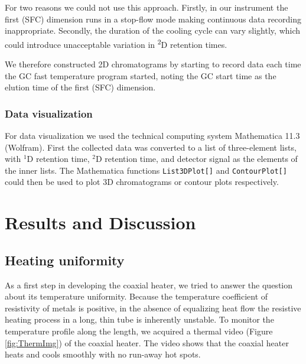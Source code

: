 \documentclass[aip,rsi,preprint,graphicx]{revtex4-1} %
\begin{document}
For two reasons we could not use this approach. Firstly, in our instrument the
first (SFC) dimension runs in a stop-flow mode making continuous data recording
inappropriate. Secondly, the duration of the cooling cycle can vary slightly,
which could introduce unacceptable variation in \textsuperscript{2}D retention
times.

We therefore constructed 2D chromatograms by starting to record data each time
the GC fast temperature program started, noting the GC start time as the elution
time of the first (SFC) dimension.

\subsubsection{Data visualization}
For data visualization we used the technical computing system Mathematica
11.3\texttrademark{} (Wolfram).  First the collected data was converted to a
list of three-element lists, with $^1$D retention time, $^2$D retention time,
and detector signal as the elements of the inner lists. The Mathematica
functions \texttt{List3DPlot[]} and \texttt{ContourPlot[]} could then be used to
plot 3D chromatograms or contour plots respectively.

\section{Results and Discussion}

\subsection{Heating uniformity}

As a first step in developing the coaxial heater, we tried to answer the
question about its temperature uniformity. Because the temperature coefficient
of resistivity of metals is positive, in the absence of equalizing heat flow the
resistive heating process in a long, thin tube is inherently unstable. To
monitor the temperature profile along the length, we acquired a thermal video
(Figure \ref{fig:ThermImg}) of the coaxial heater. The video shows that the
coaxial heater heats and cools smoothly with no run-away hot spots.

\end{document}
